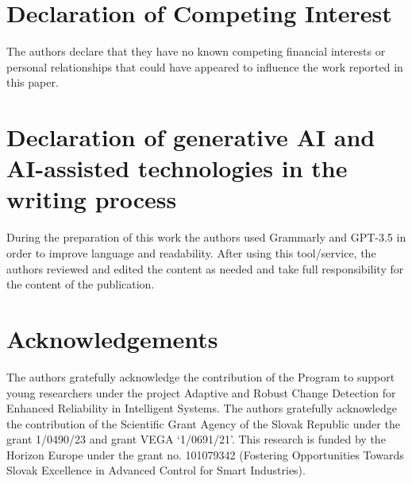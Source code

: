 \documentclass[journal]{IEEEtran}
\begin{document}
\section*{Declaration of Competing Interest}
The authors declare that they have no known competing financial interests or personal relationships that could have appeared to influence the work reported in this paper.

\section*{Declaration of generative AI and AI-assisted technologies in the writing process}
During the preparation of this work the authors used Grammarly and GPT-3.5 in order to improve language and readability. After using this tool/service, the authors reviewed and edited the content as needed and take full responsibility for the content of the publication.

\section*{Acknowledgements}
The authors gratefully acknowledge the contribution of the Program to support young researchers under the project Adaptive and Robust Change Detection for Enhanced Reliability in Intelligent Systems. The authors gratefully acknowledge the contribution of the Scientific Grant Agency of the Slovak Republic under the grant 1/0490/23 and grant VEGA `1/0691/21'. This research is funded by the Horizon Europe under the grant no. 101079342 (Fostering Opportunities Towards Slovak Excellence in Advanced Control for Smart Industries).



\end{document}
